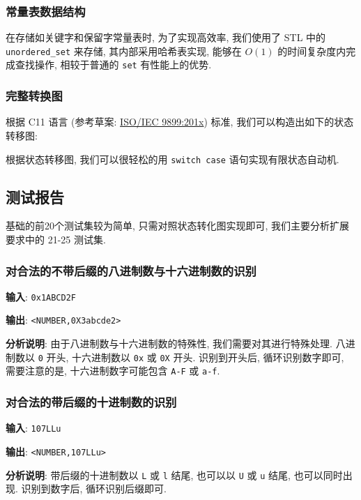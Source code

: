\subsubsection{常量表数据结构}

在存储如关键字和保留字常量表时, 为了实现高效率, 我们使用了 STL 中的 \texttt{unordered\_set} 来存储, 其内部采用哈希表实现, 能够在 $O(1)$ 的时间复杂度内完成查找操作, 相较于普通的 \texttt{set} 有性能上的优势.   

\subsubsection{完整转换图}

根据 C11 语言 (参考草案: \href{https://open-std.org/JTC1/SC22/WG14/www/docs/n1570.pdf}{ISO/IEC 9899:201x}) 标准, 我们可以构造出如下的状态转移图:



根据状态转移图, 我们可以很轻松的用 \texttt{switch case} 语句实现有限状态自动机.

\subsection{测试报告}

基础的前20个测试集较为简单, 只需对照状态转化图实现即可, 我们主要分析扩展要求中的 21-25 测试集.

\subsubsection{对合法的不带后缀的八进制数与十六进制数的识别}

\textbf{输入}: \verb|0x1ABCD2F|

\textbf{输出}: \verb|<NUMBER,0X3abcde2>|

\textbf{分析说明}: 由于八进制数与十六进制数的特殊性, 我们需要对其进行特殊处理. 八进制数以 \verb|0| 开头, 十六进制数以 \verb|0x| 或 \verb|0X| 开头. 识别到开头后, 循环识别数字即可, 需要注意的是, 十六进制数字可能包含 \verb|A-F| 或 \verb|a-f|.

\subsubsection{对合法的带后缀的十进制数的识别}

\textbf{输入}: \verb|107LLu|

\textbf{输出}: \verb|<NUMBER,107LLu>|

\textbf{分析说明}: 带后缀的十进制数以 \verb|L| 或 \verb|l| 结尾, 也可以以 \verb|U| 或 \verb|u| 结尾, 也可以同时出现. 识别到数字后, 循环识别后缀即可.

